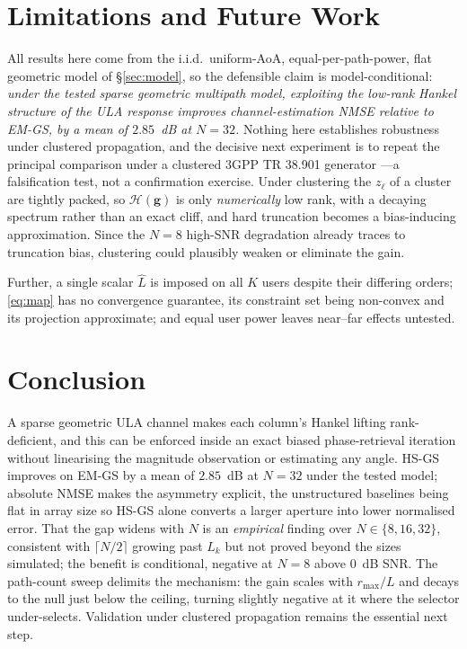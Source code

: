 \documentclass[conference]{IEEEtran}
\newcommand{\bg}{\mathbf{g}}
\newcommand{\Hank}{\mathcal{H}}
\begin{document}
\section{Limitations and Future Work}\label{sec:limits}
All results here come from the i.i.d.\ uniform-AoA, equal-per-path-power, flat
geometric model of \S\ref{sec:model}, so the defensible claim is
model-conditional: \emph{under the tested sparse geometric multipath model,
exploiting the low-rank Hankel structure of the ULA response improves
channel-estimation NMSE relative to EM-GS, by a mean of $2.85$~dB at $N=32$.}
Nothing here establishes robustness under clustered propagation, and the
decisive next experiment is to repeat the principal comparison under a
clustered 3GPP TR 38.901 generator \cite{tr38901}---a falsification test, not a
confirmation exercise. Under clustering the $z_\ell$ of a cluster are tightly
packed, so $\Hank(\bg)$ is only \emph{numerically} low rank, with a decaying
spectrum rather than an exact cliff, and hard truncation becomes a
bias-inducing approximation. Since the $N=8$ high-SNR degradation already
traces to truncation bias, clustering could plausibly weaken or eliminate the
gain.

Further, a single scalar $\hat L$ is imposed on all $K$ users despite their
differing orders; \eqref{eq:map} has no convergence guarantee, its constraint
set being non-convex and its projection approximate; and equal user power
leaves near--far effects untested.

\section{Conclusion}\label{sec:conclusion}
A sparse geometric ULA channel makes each column's Hankel lifting
rank-deficient, and this can be enforced inside an exact biased
phase-retrieval iteration without linearising the magnitude observation or
estimating any angle. HS-GS improves on EM-GS by a mean of $2.85$~dB at $N=32$
under the tested model; absolute NMSE makes the asymmetry explicit, the
unstructured baselines being flat in array size so HS-GS alone converts a
larger aperture into lower normalised error. That the gap widens with $N$ is an
\emph{empirical} finding over $N\in\{8,16,32\}$, consistent with $\lceil
N/2\rceil$ growing past $L_k$ but not proved beyond the sizes simulated; the
benefit is conditional, negative at $N=8$ above $0$~dB SNR. The path-count
sweep delimits the mechanism: the gain scales with $r_{\max}/L$ and decays to
the null just below the ceiling, turning slightly negative at it where the
selector under-selects. Validation under clustered propagation remains the essential next
step.
\end{document}
